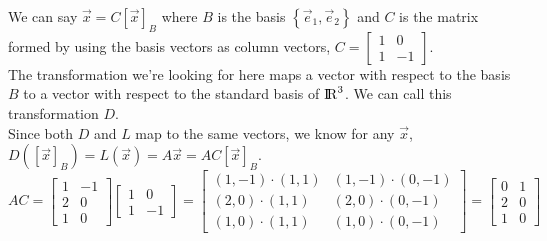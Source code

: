 \documentclass{article}
\begin{document}
\begin{problem}
\begin{description}
        We can say $\vec{x} = C[\vec{x}]_B$ where $B$ is the basis $\left \{ \vec{e}_1, \vec{e}_2 \right \}$ 
        and $C$ is the matrix formed by using the basis vectors as column vectors, $C = \begin{bmatrix} 1 & 0 \\ 1 & -1 \end{bmatrix}$.\\
        The transformation we're looking for here maps a vector with respect to the basis $B$ to a vector with respect to the standard basis of ${\rm I\!R}^3$. We can call this transformation $D$.\\
        Since both $D$ and $L$ map to the same vectors, we know for any $\vec{x}$, $D([\vec{x}]_B)=L(\vec{x})=A\vec{x}=AC[\vec{x}]_B$.\\

        $AC= \begin{bmatrix} 1 & -1 \\ 2 & 0 \\ 1 & 0 \end{bmatrix} \begin{bmatrix} 1 & 0 \\ 1 & -1 \end{bmatrix} = 
        \begin{bmatrix} (1, -1)\cdot(1, 1) & (1, -1)\cdot(0, -1) \\
                        (2, 0)\cdot(1, 1) & (2, 0)\cdot(0, -1) \\
                        (1, 0)\cdot(1, 1) & (1, 0)\cdot(0, -1) \end{bmatrix} =
        \begin{bmatrix} 0 & 1 \\ 2 & 0 \\ 1 & 0 \end{bmatrix}$

    \end{description}

\end{problem}
\end{document}
